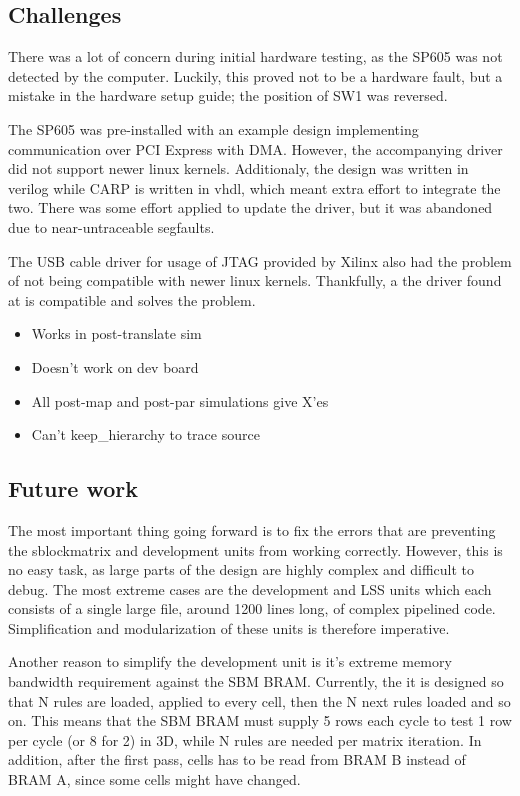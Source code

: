 \subsection{Challenges}

There was a lot of concern during initial hardware testing, as the SP605 was not detected by the computer.
Luckily, this proved not to be a hardware fault, but a mistake in the hardware setup guide; the position of SW1 was reversed.

The SP605 was pre-installed with an example design implementing communication over PCI Express with DMA.
However, the accompanying driver did not support newer linux kernels.
Additionaly, the design was written in verilog while CARP is written in vhdl, which meant extra effort to integrate the two.
There was some effort applied to update the driver, but it was abandoned due to near-untraceable segfaults.

The USB cable driver for usage of JTAG provided by Xilinx also had the problem of not being compatible with newer linux kernels.
Thankfully, a the driver found at \cite{usbdriver} is compatible and solves the problem.


\begin{itemize}
    \item Works in post-translate sim
    \item Doesn't work on dev board
    \item All post-map and post-par simulations give X'es
    \item Can't keep\_hierarchy to trace source
\end{itemize}

\subsection{Future work}

The most important thing going forward is to fix the errors that are preventing the sblockmatrix and development units from working correctly.
However, this is no easy task, as large parts of the design are highly complex and difficult to debug.
The most extreme cases are the development and LSS units which each consists of a single large file, around 1200 lines long, of complex pipelined code.
Simplification and modularization of these units is therefore imperative.

Another reason to simplify the development unit is it's extreme memory bandwidth requirement against the SBM BRAM.
Currently, the it is designed so that N rules are loaded, applied to every cell, then the N next rules loaded and so on.
This means that the SBM BRAM must supply 5 rows each cycle to test 1 row per cycle (or 8 for 2) in 3D, while N rules are needed per matrix iteration.
In addition, after the first pass, cells has to be read from BRAM B instead of BRAM A, since some cells might have changed.

